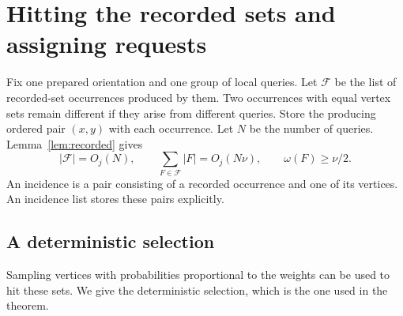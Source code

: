 \documentclass[11pt]{article}
\theoremstyle{definition}
\theoremstyle{remark}
\newcommand{\wt}{\omega}
\begin{document}
\section{Hitting the recorded sets and assigning requests}
\label{sec:assignment}
Fix one prepared orientation and one group of local queries. Let \(\mathcal F\) be the list of recorded-set occurrences produced by them. Two occurrences with equal vertex sets remain different if they arise from different queries. Store the producing ordered pair \((x,y)\) with each occurrence. Let \(N\) be the number of queries. Lemma~\ref{lem:recorded} gives
\begin{equation}
 |\mathcal F|=O_j(N),\qquad
 \sum_{F\in\mathcal F}|F|=O_j(N\nu),\qquad
 \wt(F)\ge\nu/2.
 \label{eq:incidences}
\end{equation}
An incidence is a pair consisting of a recorded occurrence and one of its vertices. An incidence list stores these pairs explicitly.

\subsection{A deterministic selection}
Sampling vertices with probabilities proportional to the weights can be used to hit these sets. We give the deterministic selection, which is the one used in the theorem.
\end{document}
